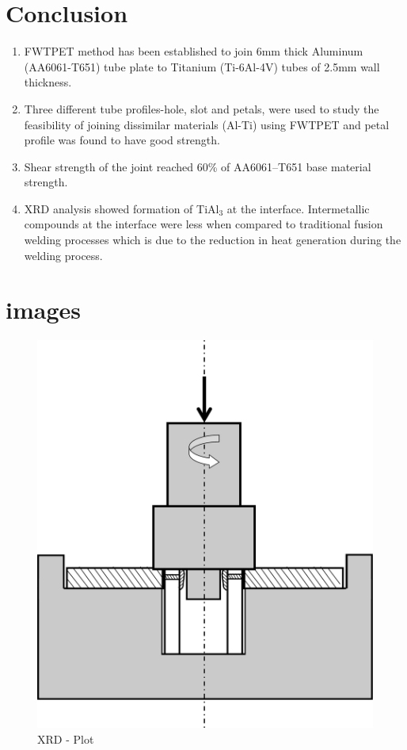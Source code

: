 \documentclass[3p]{elsarticle}
\begin{document}
\section{Conclusion}
\label{sec:Conclusion}
\begin{enumerate}[1.]
\item FWTPET method has been established to join 6mm thick Aluminum (AA6061-T651) tube plate to Titanium (Ti-6Al-4V) tubes of 2.5mm wall thickness.
\item Three different tube profiles-hole, slot and petals, were used to study the feasibility of joining dissimilar materials (Al-Ti) using FWTPET and petal profile was found to have good strength.
\item Shear strength of the joint reached 60\% of AA6061–T651 base material strength.
\item XRD analysis showed formation of TiAl$_{3}$ at the interface. Intermetallic compounds at the interface were less when compared to traditional fusion welding processes which is due to the reduction in heat generation during the welding process.
\end{enumerate}




\section{images}
\begin{figure}[!htbp]
\centering
\includegraphics[width=\textwidth,keepaspectratio]{images/welding-set-up.png}
\caption{XRD - Plot}
\label{fig:xrd-plot}
\end{figure}
\end{document}
